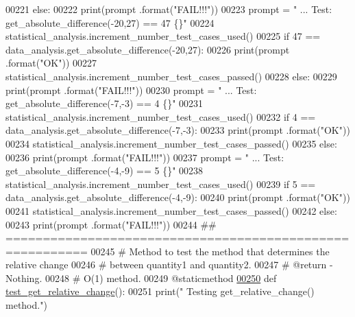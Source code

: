 \begin{DoxyCode}
00221         \textcolor{keywordflow}{else}:
00222             print(prompt .format(\textcolor{stringliteral}{"FAIL!!!"}))
00223         prompt = \textcolor{stringliteral}{"  ... Test: get\_absolute\_difference(-20,27) == 47     \{\}"}
00224         statistical\_analysis.increment\_number\_test\_cases\_used()
00225         \textcolor{keywordflow}{if} 47 == data\_analysis.get\_absolute\_difference(-20,27):
00226             print(prompt .format(\textcolor{stringliteral}{"OK"}))
00227             statistical\_analysis.increment\_number\_test\_cases\_passed()
00228         \textcolor{keywordflow}{else}:
00229             print(prompt .format(\textcolor{stringliteral}{"FAIL!!!"}))
00230         prompt = \textcolor{stringliteral}{"  ... Test: get\_absolute\_difference(-7,-3) == 4       \{\}"}
00231         statistical\_analysis.increment\_number\_test\_cases\_used()
00232         \textcolor{keywordflow}{if} 4 == data\_analysis.get\_absolute\_difference(-7,-3):
00233             print(prompt .format(\textcolor{stringliteral}{"OK"}))
00234             statistical\_analysis.increment\_number\_test\_cases\_passed()
00235         \textcolor{keywordflow}{else}:
00236             print(prompt .format(\textcolor{stringliteral}{"FAIL!!!"}))
00237         prompt = \textcolor{stringliteral}{"  ... Test: get\_absolute\_difference(-4,-9) == 5       \{\}"}
00238         statistical\_analysis.increment\_number\_test\_cases\_used()
00239         \textcolor{keywordflow}{if} 5 == data\_analysis.get\_absolute\_difference(-4,-9):
00240             print(prompt .format(\textcolor{stringliteral}{"OK"}))
00241             statistical\_analysis.increment\_number\_test\_cases\_passed()
00242         \textcolor{keywordflow}{else}:
00243             print(prompt .format(\textcolor{stringliteral}{"FAIL!!!"}))
00244     \textcolor{comment}{## =========================================================}
00245     \textcolor{comment}{#   Method to test the method that determines the relative change}
00246     \textcolor{comment}{#       between quantity1 and quantity2.}
00247     \textcolor{comment}{#   @return - Nothing.}
00248     \textcolor{comment}{#   O(1) method.}
00249     @staticmethod
\hypertarget{test__data__analysis__tool_8py_source_l00250}{}\hyperlink{classstatistics_1_1test__data__analysis__tool_1_1data__analysis__tester_a8ca74240a173de29733a73137df4bd95}{00250}     \textcolor{keyword}{def }\hyperlink{classstatistics_1_1test__data__analysis__tool_1_1data__analysis__tester_a8ca74240a173de29733a73137df4bd95}{test\_get\_relative\_change}():
00251         print(\textcolor{stringliteral}{" Testing get\_relative\_change() method."})

\end{DoxyCode}
